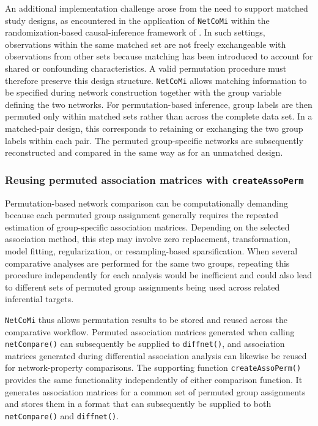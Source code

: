 An additional implementation challenge arose from the need to support matched study designs, as encountered in the application of \texttt{NetCoMi} within the randomization-based causal-inference framework of \citet{sommer2022randomizationbased}. In such settings, observations within the same matched set are not freely exchangeable with observations from other sets because matching has been introduced to account for shared or confounding characteristics. A valid permutation procedure must therefore preserve this design structure. \texttt{NetCoMi} allows matching information to be specified during network construction together with the group variable defining the two networks. For permutation-based inference, group labels are then permuted only within matched sets rather than across the complete data set. In a matched-pair design, this corresponds to retaining or exchanging the two group labels within each pair. The permuted group-specific networks are subsequently reconstructed and compared in the same way as for an unmatched design.


\subsubsection{Reusing permuted association matrices with \texttt{createAssoPerm}}

Permutation-based network comparison can be computationally demanding because each permuted group assignment generally requires the repeated estimation of group-specific association matrices. Depending on the selected association method, this step may involve zero replacement, transformation, model fitting, regularization, or resampling-based sparsification. When several comparative analyses are performed for the same two groups, repeating this procedure independently for each analysis would be inefficient and could also lead to different sets of permuted group assignments being used across related inferential targets.

\texttt{NetCoMi} thus allows permutation results to be stored and reused across the comparative workflow. Permuted association matrices generated when calling \texttt{netCompare()} can subsequently be supplied to \texttt{diffnet()}, and association matrices generated during differential association analysis can likewise be reused for network-property comparisons. The supporting function \texttt{createAssoPerm()} provides the same functionality independently of either comparison function. It generates association matrices for a common set of permuted group assignments and stores them in a format that can subsequently be supplied to both \texttt{netCompare()} and \texttt{diffnet()}.


